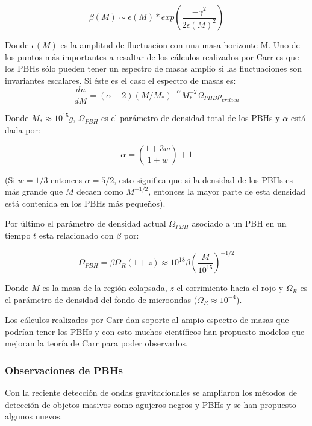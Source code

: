 \documentclass{article}
\begin{document}
\begin{equation}
\beta(M)\sim \epsilon(M)*exp\left(\frac{-\gamma^2}{2\epsilon(M)^2}\right)
\end{equation}

Donde $\epsilon(M)$ es la amplitud de fluctuacion con una masa horizonte M.
Uno de los puntos m\'as importantes a resaltar de los c\'alculos realizados por Carr es que los PBHs s\'olo pueden tener un espectro de masas amplio si las fluctuaciones son invariantes escalares. Si \'este es el caso el espectro de masas es:
\begin{equation}
\frac{dn}{dM} = (\alpha -2)(M/M_*)^{-\alpha} M_* ^{-2} \Omega_{PHB} \rho_{critica} 
\end{equation}

Donde $M_*\approx 10^{15} g$, $\Omega_{PBH}$ es el par\'ametro de densidad total de los PBHs y $\alpha$ est\'a dada por:

\begin{equation}
\alpha=\left(\frac{1+3w}{1+w}\right) + 1
\end{equation}

(Si $w=1/3$ entonces $\alpha=5/2$, esto significa que si la densidad de los PBHs es m\'as grande que $M$ decaen como $M^{-1/2}$, entonces la mayor parte de esta densidad est\'a contenida en los PBHs m\'as peque\~nos).

Por \'ultimo el par\'ametro de densidad actual $\Omega_{PBH}$ asociado a un PBH en un tiempo $t$ esta relacionado con $\beta$ por:

\begin{equation}
\Omega_{PBH}=\beta \Omega_R (1+z) \approx 10^{18} \beta \left(\frac{M}{10^{15}}\right)^{-1/2}
\end{equation}

Donde $M$ es la masa de la regi\'on colapsada, $z$ el corrimiento hacia el rojo y $\Omega_R$ es el par\'ametro de densidad del fondo de microondas ($\Omega_R \approx 10^{-4}$). 

Los c\'alculos realizados por Carr dan soporte al ampio espectro de masas que podr\'ian tener los PBHs y con esto muchos cient\'ificos han propuesto modelos que mejoran la teor\'ia de Carr para poder observarlos.

\subsubsection*{Observaciones de PBHs}
Con la reciente detecci\'on de ondas gravitacionales se ampliaron los m\'etodos de detecci\'on de objetos masivos como agujeros negros y PBHs y se han propuesto algunos nuevos.
\end{document}
